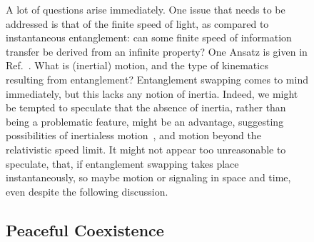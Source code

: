 \documentclass[entropy,article,accept,oneauthor,pdftex]{Definitions/mdpi}
\begin{document}
\begin{figure}[H]
A lot of questions arise immediately.
One issue that needs to be addressed is that of the finite speed of light,
as compared to instantaneous entanglement: can some finite speed of information transfer
be derived from an infinite property? One Ansatz is given in Ref.~\cite{Couch2020}.
What is (inertial) motion, and the type of kinematics resulting from entanglement?
Entanglement swapping comes to mind immediately, but this lacks any notion of inertia.
Indeed, we might be tempted to speculate that the absence of inertia,
rather than being a problematic feature, might be an advantage, suggesting
possibilities of inertialess motion~\cite{Knuth-e21100939}, and motion beyond the relativistic speed limit.
It might not appear too unreasonable to speculate, that,
if entanglement swapping takes place instantaneously, so maybe motion or signaling in space and time,
even despite the following discussion.

\subsection{Peaceful Coexistence}


\end{figure}
\end{document}
